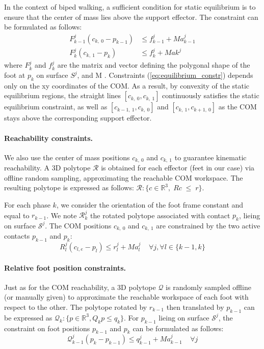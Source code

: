 In the context of biped walking, a sufficient condition for static equilibrium is to ensure that the center of mass lies above the support effector.
The constraint can be formulated as follows:
\begin{equation}
    \label{eq:equilibrium_constr}
    \begin{aligned}
        F^{j}_{k-1} (c_{k,\:0}-p_{k-1}) &\leq  f_{k-1}^{j} + M a_{k-1}^{j}\\
        F^{j}_{k} (c_{k,\:1}-p_{k}) &\leq  f^j_{k} + M a{k}^{j}
    \end{aligned}
\end{equation}
where $F_k^j$ and $f_k^j$ are the matrix and vector defining the polygonal shape of the foot at $p_k$ on surface $S^j$, and M .
Constraints (\ref{eq:equilibrium_constr}) depends only on the xy coordinates of the COM.
As a result, by convexity of the static equilibrium regions, the straight lines $[c_{k,\:0}, c_{k,\:1}]$ continuously satisfies the static equilibrium
constraint, as well as $[c_{k-1,\:1}, c_{k,\:0}]$ and $[c_{k,\:1}, c_{k+1,\:0}]$ as the COM stays above the corresponding support effector.

\paragraph{Reachability constraints.}
We also use the center of mass positions $c_{k,\:0}$ and $c_{k,\:1}$ to guarantee kinematic reachability.
A 3D polytope $\mathcal{R}$ is obtained for each effector (feet in our case) via offline random sampling, approximating the reachable COM workspace.
The resulting polytope is expressed as follows: $\mathcal{R} : \{c \in \mathbb{R}^3 , \; \! R c \; \leq \; \! r\}$.

For each phase $k$, we consider the orientation of the foot frame constant and equal to $r_{k-1}$.
We note $\mathcal{R}_k^j$ the rotated polytope associated with contact $p_{k}$, lieing on surface $\mathcal{S}^j$.
The COM positions $c_{k,\:0}$ and $c_{k,\:1}$ are constrained by the two active contacts $p_{k-1}$ and $p_{k}$:
\begin{equation}
    R_{l}^j (c_{l,e} - p_{l}) \leq r_l^j + M a_l^j \;\;\;\; \forall j, \forall l \in \{k-1,k\}
\end{equation}

\paragraph{Relative foot position constraints.\label{appendix:foot_pos_constr}}
Just as for the COM reachability, a 3D polytope $\mathcal{Q}$ is randomly sampled offline (or manually given) to approximate the reachable workspace of each foot with respect to the other. The polytope rotated by $r_{k-1}$ then translated by $p_{k-1}$ can be expressed as $\mathcal{Q}_k: \{ p \in \mathbb{R}^3, Q_k p \leq q_k \}$.
For $p_{k-1}$ lieing on surface $\mathcal{S}^j$, the constraint on foot positions $p_{k-1}$ and $p_k$ can be formulated as follows:
\begin{equation}
    \mathcal{Q}_{k-1}^j (p_k - p_{k-1}) \leq q_{k-1}^j + M a_{k-1}^j \;\;\;\; \forall j
\end{equation}

